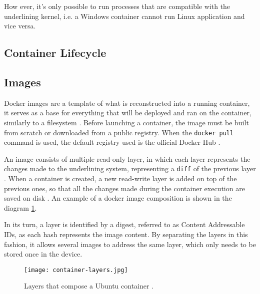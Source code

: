 How ever, it's only possible to run processes that are compatible with the underlining kernel, i.e. a Windows container cannot run Linux application and vice versa.

\subsection{Container Lifecycle}


\subsection{Images}
\label{sec::arch:images}
Docker images are a template of what is reconstructed into a running container, it serves as a base for everything that will be deployed and ran on the container, similarly to a filesystem \cite{Kane2018-fn}. Before launching a container, the image must be built from scratch or downloaded from a public registry. When the \texttt{docker pull} command is used, the default registry used is the official Docker Hub \cite{docker-hub}.

An image consists of multiple read-only layer, in which each layer represents the changes made to the underlining system, representing a \texttt{diff} of the previous layer \cite{images-layers}. When a container is created, a new read-write layer is added on top of the previous ones, so that all the changes made during the container execution are saved on disk \cite{fig-src:image-layers}. An example of a docker image composition is shown in the diagram \ref{fig:docker-image}.

In its turn, a layer is identified by a digest, referred to as Content Addressable IDs, as each hash represents the image content. By separating the layers in this fashion, it allows several images to address the same layer, which only needs to be stored once in the device.

\begin{figure}[!htb]
    \centering
    \texttt{[image: container-layers.jpg]}
    \caption{Layers that compose a Ubuntu container \cite{fig-src:image-layers}.}
    \label{fig:docker-image}
\end{figure}

